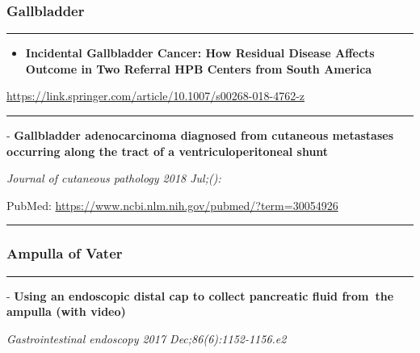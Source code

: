 \documentclass[]{article}
\providecommand{\tightlist}{%
  \setlength{\itemsep}{0pt}\setlength{\parskip}{0pt}}
\begin{document}
\hypertarget{gallbladder-3}{%
\subsubsection{Gallbladder}\label{gallbladder-3}}

\begin{center}\rule{0.5\linewidth}{\linethickness}\end{center}

\begin{itemize}
\tightlist
\item
  \textbf{Incidental Gallbladder Cancer: How Residual Disease Affects
  Outcome in Two Referral HPB Centers from South America}
\end{itemize}

\url{https://link.springer.com/article/10.1007/s00268-018-4762-z}

\begin{center}\rule{0.5\linewidth}{\linethickness}\end{center}

 - \textbf{Gallbladder adenocarcinoma diagnosed from cutaneous
metastases occurring along the tract of a ventriculoperitoneal shunt}

\emph{Journal of cutaneous pathology 2018 Jul;():}

PubMed: \url{https://www.ncbi.nlm.nih.gov/pubmed/?term=30054926}

{}

{}

\begin{center}\rule{0.5\linewidth}{\linethickness}\end{center}

\hypertarget{ampulla-of-vater-3}{%
\subsubsection{Ampulla of Vater}\label{ampulla-of-vater-3}}

\begin{center}\rule{0.5\linewidth}{\linethickness}\end{center}

 - \textbf{Using an endoscopic distal cap to collect pancreatic fluid
from~the ampulla (with video)}

\emph{Gastrointestinal endoscopy 2017 Dec;86(6):1152-1156.e2}
\end{document}
